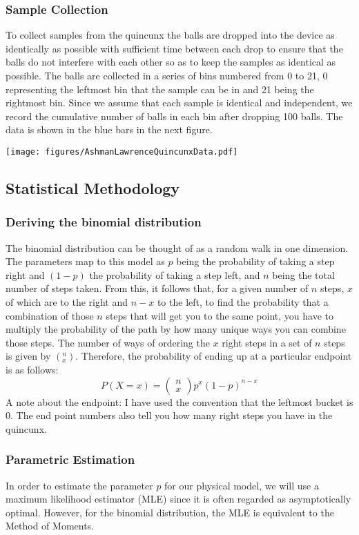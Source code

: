\subsubsection*{Sample Collection}
To collect samples from the quincunx the balls are dropped into the device as identically as possible with sufficient time between each drop to ensure that the balls do not interfere with each other so as to keep the samples as identical as possible. The balls are collected in a series of bins numbered from 0 to 21, 0 representing the leftmost bin that the sample can be in and 21 being the rightmost bin. Since we assume that each sample is identical and independent, we record the cumulative number of balls in each bin after dropping 100 balls.
The data is shown in the blue bars in the next figure.

\begin{center}
\texttt{[image: figures/AshmanLawrenceQuincunxData.pdf]}
\end{center}

\subsection{Statistical Methodology}
\subsubsection*{Deriving the binomial distribution}
The binomial distribution can be thought of as a random walk in one dimension. The parameters map to this model as $p$ being the probability of taking a step right and $(1-p)$ the probability of taking a step left, and $n$ being the total number of steps taken. From this, it follows that, for a given number of $n$ steps, $x$ of which are to the right and $n-x$ to the left, to find the probability that a combination of those $n$ steps that will get you to the same point, you have to multiply the probability of the path by how many unique ways you can combine those steps. The number of ways of ordering the $x$ right steps in a set of $n$ steps is given by $(^n_x)$. Therefore, the probability of ending up at a particular endpoint is as follows: $$P(X=x)=\left(\begin{array}{c}n\\x\end{array}\right)p^x(1-p)^{n-x}$$
A note about the endpoint: I have used the convention that the leftmost bucket is 0. The end point numbers also tell you how many right steps you have in the quincunx.
\subsubsection*{Parametric Estimation}
In order to estimate the parameter $p$ for our physical model, we will use a maximum likelihood estimator (MLE) since it is often regarded as asymptotically optimal. However, for the binomial distribution, the MLE is equivalent to the Method of Moments.
